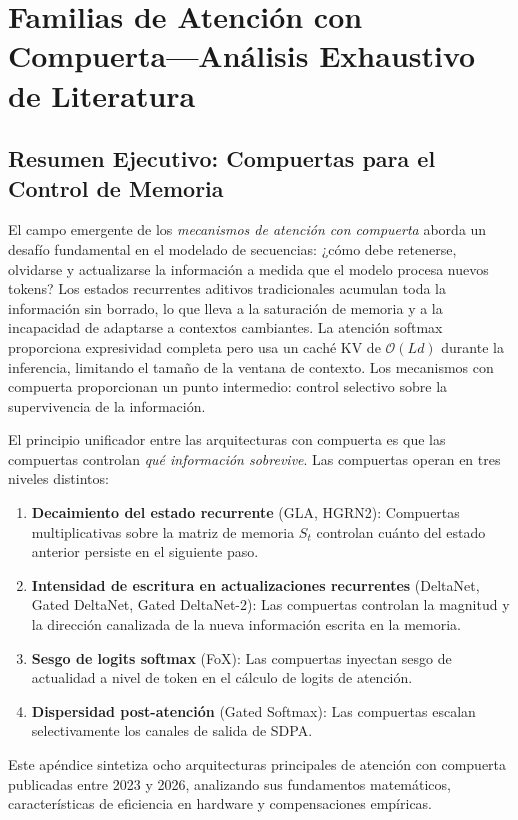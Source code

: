 \section{Familias de Atención con Compuerta---Análisis Exhaustivo de Literatura}
\label{sec:annex-gated}

\subsection{Resumen Ejecutivo: Compuertas para el Control de Memoria}

El campo emergente de los \emph{mecanismos de atención con compuerta} aborda un desafío fundamental en el modelado de secuencias: ¿cómo debe retenerse, olvidarse y actualizarse la información a medida que el modelo procesa nuevos tokens? Los estados recurrentes aditivos tradicionales acumulan toda la información sin borrado, lo que lleva a la saturación de memoria y a la incapacidad de adaptarse a contextos cambiantes. La atención softmax proporciona expresividad completa pero usa un caché KV de $\mathcal{O}(Ld)$ durante la inferencia, limitando el tamaño de la ventana de contexto. Los mecanismos con compuerta proporcionan un punto intermedio: control selectivo sobre la supervivencia de la información.

El principio unificador entre las arquitecturas con compuerta es que las compuertas controlan \textit{qué información sobrevive}. Las compuertas operan en tres niveles distintos:
\begin{enumerate}[leftmargin=*]
    \item \textbf{Decaimiento del estado recurrente} (GLA, HGRN2): Compuertas multiplicativas sobre la matriz de memoria $S_t$ controlan cuánto del estado anterior persiste en el siguiente paso.
    \item \textbf{Intensidad de escritura en actualizaciones recurrentes} (DeltaNet, Gated DeltaNet, Gated DeltaNet-2): Las compuertas controlan la magnitud y la dirección canalizada de la nueva información escrita en la memoria.
    \item \textbf{Sesgo de logits softmax} (FoX): Las compuertas inyectan sesgo de actualidad a nivel de token en el cálculo de logits de atención.
    \item \textbf{Dispersidad post-atención} (Gated Softmax): Las compuertas escalan selectivamente los canales de salida de SDPA.
\end{enumerate}

Este apéndice sintetiza ocho arquitecturas principales de atención con compuerta publicadas entre 2023 y 2026, analizando sus fundamentos matemáticos, características de eficiencia en hardware y compensaciones empíricas.


